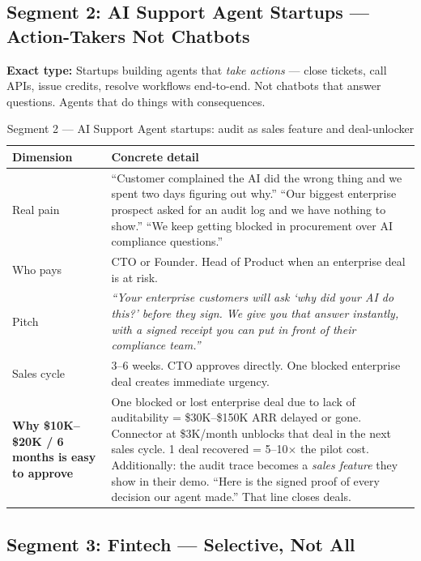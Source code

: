 \subsection{Segment 2: AI Support Agent Startups \texorpdfstring{---}{-} Action-Takers Not Chatbots}

\textbf{Exact type:} Startups building agents that \emph{take actions} ---
close tickets, call APIs, issue credits, resolve workflows end-to-end. Not
chatbots that answer questions. Agents that do things with consequences.

\begin{table}[H]
\centering\renewcommand{\arraystretch}{1.55}
\begin{tabularx}{\textwidth}{@{}lX@{}}
\toprule
\textbf{Dimension} & \textbf{Concrete detail} \\
\midrule
Real pain & ``Customer complained the AI did the wrong thing and we spent
  two days figuring out why.'' ``Our biggest enterprise prospect asked for
  an audit log and we have nothing to show.'' ``We keep getting blocked in
  procurement over AI compliance questions.'' \\
Who pays & CTO or Founder. Head of Product when an enterprise deal is at risk. \\
Pitch & \textit{``Your enterprise customers will ask `why did your AI do this?'
  before they sign. We give you that answer instantly, with a signed receipt
  you can put in front of their compliance team.''} \\
Sales cycle & 3--6 weeks. CTO approves directly. One blocked enterprise deal
  creates immediate urgency. \\
\midrule
\textbf{Why \$10K--\$20K / 6 months is easy to approve} &
  One blocked or lost enterprise deal due to lack of auditability = \$30K--\$150K
  ARR delayed or gone. Connector at \$3K/month unblocks that deal in the next
  sales cycle. 1 deal recovered = 5--10$\times$ the pilot cost. Additionally:
  the audit trace becomes a \emph{sales feature} they show in their demo.
  ``Here is the signed proof of every decision our agent made.'' That line
  closes deals. \\
\bottomrule
\end{tabularx}
\caption{Segment 2 --- AI Support Agent startups: audit as sales feature and deal-unlocker}
\end{table}

\subsection{Segment 3: Fintech \texorpdfstring{---}{-} Selective, Not All}

